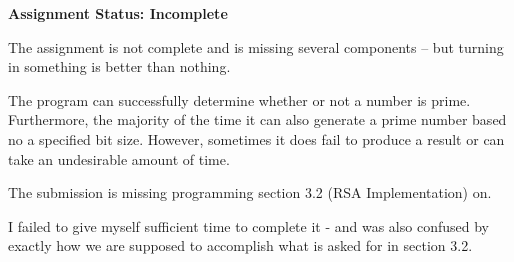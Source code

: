 \documentclass[11pt]{memo}
\begin{document}
\USM

\Date{\today}

\begin{memo}

\textbf{Assignment Status: Incomplete}

The assignment is not complete and is missing several components -- but turning in something is better than nothing.

The program can successfully determine whether or not a number is prime.  Furthermore, the majority of the time it can also generate a prime number based no a specified bit size.  However, sometimes it does fail to produce a result or can take an undesirable amount of time.

The submission is missing programming section 3.2 (RSA Implementation) on.

I failed to give myself sufficient time to complete it - and was also confused by exactly how we are supposed to accomplish what is asked for in section 3.2.

\end{memo}
\end{document}
